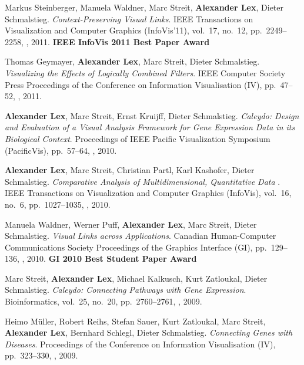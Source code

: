 \item Markus Steinberger, Manuela Waldner, Marc Streit, \textbf{Alexander Lex}, Dieter Schmalstieg. \textit{Context-Preserving Visual Links}. IEEE Transactions on Visualization and Computer Graphics (InfoVis'11), vol.\ 17, no.\ 12, pp.\ 2249--2258, , 2011. \textbf{IEEE InfoVis 2011 Best Paper Award}
\item Thomas Geymayer, \textbf{Alexander Lex}, Marc Streit, Dieter Schmalstieg. \textit{Visualizing the Effects of Logically Combined Filters}. IEEE Computer Society Press Proceedings of the Conference on Information Visualisation (IV), pp.\ 47--52, , 2011. 
\item \textbf{Alexander Lex}, Marc Streit, Ernst Kruijff, Dieter Schmalstieg. \textit{Caleydo: Design and Evaluation of a Visual Analysis Framework for Gene Expression Data in its Biological Context}.  Proceedings of IEEE Pacific Visualization Symposium (PacificVis), pp.\ 57--64, , 2010. 
\item \textbf{Alexander Lex}, Marc Streit, Christian Partl, Karl Kashofer, Dieter Schmalstieg. \textit{Comparative Analysis of Multidimensional, Quantitative Data }. IEEE Transactions on Visualization and Computer Graphics (InfoVis), vol.\ 16, no.\ 6, pp.\ 1027--1035, , 2010. 
\item Manuela Waldner, Werner Puff, \textbf{Alexander Lex}, Marc Streit, Dieter Schmalstieg. \textit{Visual Links across Applications}. Canadian Human-Computer Communications Society Proceedings of the Graphics Interface (GI), pp.\ 129--136, , 2010. \textbf{GI 2010 Best Student Paper Award}
\item Marc Streit, \textbf{Alexander Lex}, Michael Kalkusch, Kurt Zatloukal, Dieter Schmalstieg. \textit{Caleydo: Connecting Pathways with Gene Expression}. Bioinformatics, vol.\ 25, no.\ 20, pp.\ 2760--2761, , 2009. 
\item Heimo Müller, Robert Reihs, Stefan Sauer, Kurt Zatloukal, Marc Streit, \textbf{Alexander Lex}, Bernhard Schlegl, Dieter Schmalstieg. \textit{Connecting Genes with Diseases}.  Proceedings of the Conference on Information Visualisation (IV), pp.\ 323--330, , 2009. 
